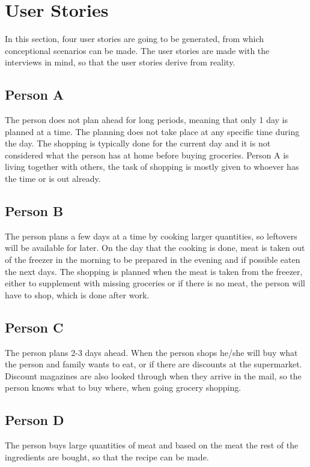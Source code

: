 \section{User Stories} \label{UserStories}

In this section, four user stories are going to be generated, from which conceptional scenarios can be made. The user stories are made with the interviews in mind, so that the user stories derive from reality.

\subsection{Person A}
The person does not plan ahead for long periods, meaning that only 1 day is planned at a time. The planning does not take place at any specific time during the day. The shopping is typically done for the current day and it is not considered what the person has at home before buying groceries. Person A is living together with others, the task of shopping is mostly given to whoever has the time or is out already.

\subsection{Person B}
The person plans a few days at a time by cooking larger quantities, so leftovers will be available for later. On the day that the cooking is done, meat is taken out of the freezer in the morning to be prepared in the evening and if possible eaten the next days. The shopping is planned when the meat is taken from the freezer, either to supplement with missing groceries or if there is no meat, the person will have to shop, which is done after work.  
 
\subsection{Person C}
The person plans 2-3 days ahead. When the person shops he/she will buy what the person and family wants to eat, or if there are discounts at the supermarket. Discount magazines are also looked through when they arrive in the mail, so the person knows what to buy where, when going grocery shopping.

\subsection{Person D}
The person buys large quantities of meat and based on the meat the rest of the ingredients are bought, so that the recipe can be made.
